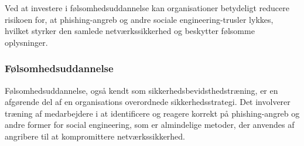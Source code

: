 \noindent
Ved at investere i følsomhedsuddannelse kan organisationer betydeligt reducere risikoen for, at phishing-angreb og andre sociale engineering-trusler lykkes, hvilket styrker den samlede netværkssikkerhed og beskytter følsomme oplysninger.


\subsubsection{Følsomhedsuddannelse}
Følsomhedsuddannelse, også kendt som sikkerhedsbevidsthedstræning, er en afgørende del af en organisations overordnede sikkerhedsstrategi. Det involverer træning af medarbejdere i at identificere og reagere korrekt på phishing-angreb og andre former for social engineering, som er almindelige metoder, der anvendes af angribere til at kompromittere netværkssikkerhed.


